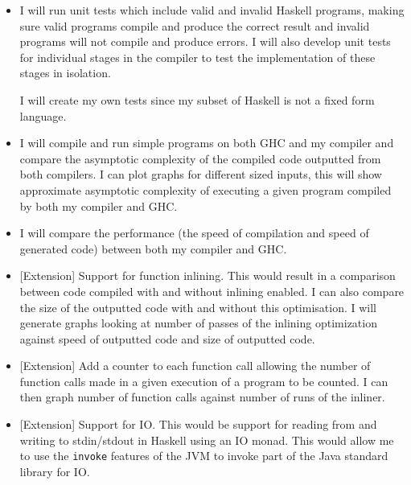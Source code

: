 \documentclass[a4paper]{article}
\begin{document}
  \begin{itemize}

    \item
      I will run unit tests which include valid and invalid Haskell programs, making sure valid programs compile and produce the correct result and invalid
      programs will not compile and produce errors. I will also develop unit tests for individual stages in the compiler to test the implementation of these stages
      in isolation.

      I will create my own tests since my subset of Haskell is not a fixed form language.

    \item 

      I will compile and run simple programs on both GHC and my compiler and compare the asymptotic complexity of the 
      compiled code outputted from both compilers. I can plot graphs for different sized inputs, 
      this will show approximate asymptotic complexity of executing a given program compiled by both my compiler and GHC.

    \item

      I will compare the performance (the speed of compilation and speed of generated code) between both my compiler and GHC.

    \item

      [Extension] Support for function inlining. This would result in a comparison between code compiled with and without inlining enabled. I can also
      compare the size of the outputted code with and without this optimisation. I will generate graphs looking at number of passes of the inlining 
      optimization against speed of outputted code and size of outputted code.

    \item 

      [Extension] Add a counter to each function call allowing the number of function calls made in a given execution of a
      program to be counted. I can then graph number of function calls against number of runs of the inliner.

    \item

      [Extension] Support for IO. This would be support for reading from and writing to stdin/stdout in Haskell using an IO monad.
      This would allow me to use the \texttt{invoke} features of the JVM to invoke part of the Java standard library for IO.


\end{itemize}
\end{document}
